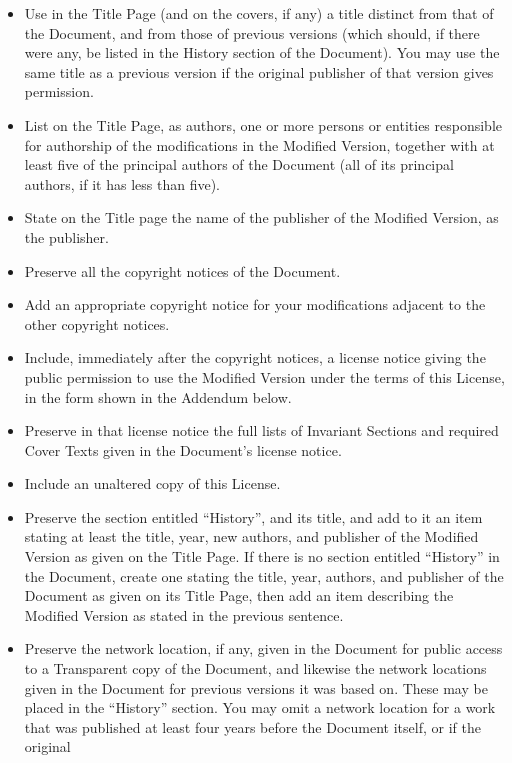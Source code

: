 	\begin{itemize}

	\item Use in the Title Page (and on the covers, if any) a title distinct
	from that of the Document, and from those of previous versions
	(which should, if there were any, be listed in the History section
	of the Document).  You may use the same title as a previous version
	if the original publisher of that version gives permission.
	\item List on the Title Page, as authors, one or more persons or entities
	responsible for authorship of the modifications in the Modified
	Version, together with at least five of the principal authors of the
	Document (all of its principal authors, if it has less than five).
	\item State on the Title page the name of the publisher of the
	Modified Version, as the publisher.
	\item Preserve all the copyright notices of the Document.
	\item Add an appropriate copyright notice for your modifications
	adjacent to the other copyright notices.
	\item Include, immediately after the copyright notices, a license notice
	giving the public permission to use the Modified Version under the
	terms of this License, in the form shown in the Addendum below.
	\item Preserve in that license notice the full lists of Invariant Sections
	and required Cover Texts given in the Document's license notice.
	\item Include an unaltered copy of this License.
	\item Preserve the section entitled ``History'', and its title, and add to
	it an item stating at least the title, year, new authors, and
	publisher of the Modified Version as given on the Title Page.  If
	there is no section entitled ``History'' in the Document, create one
	stating the title, year, authors, and publisher of the Document as
	given on its Title Page, then add an item describing the Modified
	Version as stated in the previous sentence.
	\item Preserve the network location, if any, given in the Document for
	public access to a Transparent copy of the Document, and likewise
	the network locations given in the Document for previous versions
	it was based on.  These may be placed in the ``History'' section.
	You may omit a network location for a work that was published at
	least four years before the Document itself, or if the original

\end{itemize}
